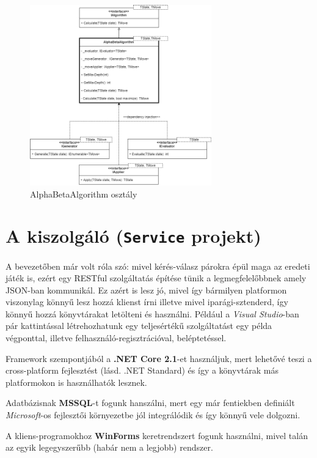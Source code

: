 \documentclass[twoside, a4paper, 12pt]{book}
\begin{document}
\begin{figure}[htbp]
	\centering
	\includegraphics[width=0.7\textwidth]{img/alphabetaAbstractDiagram.png}
	\caption{AlphaBetaAlgorithm osztály}
	\label{fig:alphaBetaAbstractDiagram}
\end{figure}
 
\section{A kiszolgáló (\texttt{Service} projekt)}
A bevezetőben már volt róla szó: mivel kérés-válasz párokra épül maga az eredeti játék is, ezért egy RESTful szolgáltatás építése tünik a legmegfelelőbbnek amely JSON-ban kommunikál. Ez azért is lesz jó, mivel így bármilyen platformon viszonylag könnyű lesz hozzá klienst írni illetve mivel iparági-sztenderd, így könnyű hozzá könyvtárakat letölteni és használni. Például a \textit{Visual Studio}-ban pár kattintással létrehozhatunk egy teljesértékű szolgáltatást egy példa végponttal, illetve felhasználó-regisztrációval, beléptetéssel.

Framework szempontjából a \textbf{.NET Core 2.1}-et használjuk, mert lehetővé teszi a cross-platform fejlesztést (lásd. .NET Standard) és így a könyvtárak más platformokon is használhatók lesznek.

Adatbázisnak \textbf{MSSQL}-t fogunk hanszálni, mert egy már fentiekben definiált \textit{Microsoft}-os fejlesztői környezetbe jól integrálódik és így könnyű vele dolgozni.

A kliens-programokhoz \textbf{WinForms} keretrendszert fogunk használni, mivel talán az egyik legegyszerűbb (habár nem a legjobb) rendszer.
\end{document}
